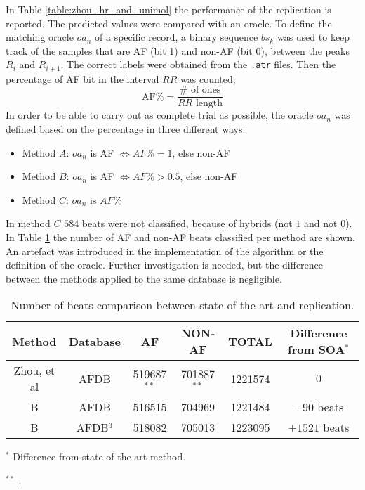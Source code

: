In Table \ref{table:zhou_hr_and_unimol} the performance of the replication is reported. The predicted values were compared with an oracle. To define the matching oracle $oa_n$ of a specific record, a binary sequence $bs_k$ was used to keep track of the samples that are AF (bit 1) and non-AF (bit 0), between the peaks $R_i$ and $R_{i+1}$. The correct labels were obtained from the \verb|.atr| files. Then the percentage of AF bit in the interval $RR$ was counted,
\begin{equation}
 \text{AF\%} = \frac{\# \text{ of ones}}{RR \text{ length}}
\end{equation}
In order to be able to carry out as complete trial as possible, the oracle $oa_n$ was defined based on the percentage in three different ways:
\begin{itemize}
\item Method $A$: $oa_n$ is AF $\iff AF\% = 1$, else non-AF
\item Method $B$: $oa_n$ is AF $\iff AF\% > 0.5$, else non-AF
\item Method $C$: $oa_n$ is $AF\%$
\end{itemize}
In method $C$ $584$ beats were not classified, because of hybrids (not $1$ and not $0$). In Table \ref{table:replication_error} the number of AF and non-AF beats classified per method are shown. An artefact was introduced in the implementation of the algorithm or the definition of the oracle. Further investigation is needed, but the difference between the methods applied to the same database is negligible.
\begin{table}
\begin{center}
\begin{threeparttable}
\caption{Number of beats comparison between state of the art and replication.}
\label{table:replication_error}
\scriptsize
  \begin{tabular}{c c c c c c}
  \toprule
  \textbf{Method} & \textbf{Database} & \textbf{AF} & \textbf{NON-AF} & \textbf{TOTAL} & \textbf{Difference from SOA}$^*$ \\
  \midrule  
  Zhou, et al\cite{zhou2015} & AFDB & 519687$^{**}$ & 701887$^{**}$ & 1221574 & $0$ \\
  B & AFDB & 516515 & 704969 & 1221484 & $-90$ beats\\
  B & AFDB$^3$ & 518082 & 705013 & 1223095 & $+1521$ beats \\
  \bottomrule
\end{tabular}
\begin{tablenotes}
 	\item $^*$ Difference from state of the art method.
 	\item $^{**}$ \cite[p. 9]{zhou2015}.
    \end{tablenotes}
\end{threeparttable}
\end{center}
\end{table}

